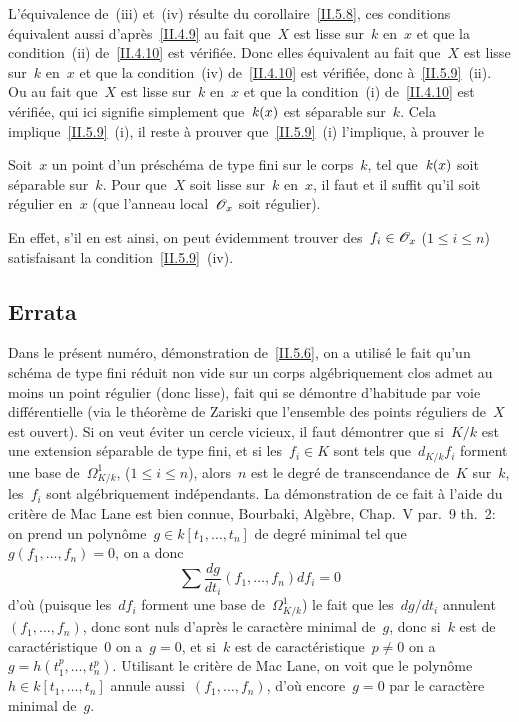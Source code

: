 L'\'equivalence de~(iii) et~(iv) r\'esulte du
corollaire~\ref{II.5.8}, ces conditions \'equivalent aussi
d'apr\`es~\ref{II.4.9} au fait que~$X$ est lisse sur~$k$ en~$x$ et
que la condition~(ii)
de~\ref{II.4.10}
est v\'erifi\'ee. Donc elles \'equivalent au fait que~$X$ est
lisse sur~$k$ en~$x$ et que la condition~(iv) de~\ref{II.4.10} est
v\'erifi\'ee, donc \`a~\ref{II.5.9}~(ii). Ou au fait que~$X$ est
lisse sur~$k$ en~$x$ et que la condition~(i) de~\ref{II.4.10} est
v\'erifi\'ee, qui ici signifie simplement
que~$\mathit{k}(x)$
est
s\'eparable sur~$k$. Cela implique~\ref{II.5.9}~(i), il reste \`a
prouver que~\ref{II.5.9}~(i) l'implique, \ie \`a prouver le

\begin{corollaire}
\label{II.5.10}
Soit~$x$ un point
d'un
pr\'esch\'ema de type fini sur le corps~$k$, tel
que~$\mathit{k}(x)$
soit s\'eparable sur~$k$. Pour que~$X$ soit lisse sur~$k$ en~$x$,
il faut et il suffit qu'il soit r\'egulier en~$x$ (\ie que l'anneau
local~$\cal{O}_x$ soit r\'egulier).
\end{corollaire}

En effet, s'il en est ainsi, on peut \'evidemment trouver
des~$f_i\in \cal{O}_x$ ($1\leq i\leq n$) satisfaisant la
condition~\ref{II.5.9}~(iv).

\subsection*{Errata}
\label{II.fin.errata}
Dans
le pr\'esent num\'ero, d\'emonstration de~\ref{II.5.6}, on
a utilis\'e le fait qu'un sch\'ema de type fini r\'eduit non
vide sur un corps alg\'ebriquement clos admet au moins un point
r\'egulier (donc lisse), fait qui se d\'emontre d'habitude par
voie diff\'erentielle (via le th\'eor\`eme de Zariski que
l'ensemble des points r\'eguliers de~$X$ est ouvert). Si on veut
\'eviter un cercle vicieux, il faut d\'emontrer que si~$K/k$ est
une extension s\'eparable de type fini, et si les~$f_i\in K$ sont
tels que~$d_{K/k}f_i$ forment une base de~$\Omega^1_{K/k}$, ($1\leq
i\leq n$), alors~$n$ est le degr\'e de transcendance de~$K$
sur~$k$,
\ie les~$f_i$ sont alg\'ebriquement ind\'ependants. La
d\'emonstration de ce fait \`a l'aide du crit\`ere de
Mac Lane
est bien connue, \cf Bourbaki, Alg\`ebre, Chap.\, V par.\, 9 th.\, 2: on
prend un polyn\^ome~$g\in k[t_1,\dots,t_n]$ de degr\'e minimal
tel que~$g(f_1,\dots,f_n)=0$, on a donc
$$
\sum\frac{dg}{d t_i}(f_1,\dots,f_n) df_i=0
$$
d'o\`u (puisque les~$df_i$ forment une base de~$\Omega^1_{K/k}$) le
fait que les~$dg/d t_i$ annulent~$(f_1,\dots,f_n)$, donc sont nuls
d'apr\`es le caract\`ere minimal de~$g$, donc si~$k$ est de
caract\'eristique~$0$ on a~$g=0$, et si~$k$ est de
caract\'eristique~$p\neq 0$ on a~$g=h(t_1^p,\dots,t_n^p)$.
Utilisant le crit\`ere de
Mac Lane,
on voit que le
polyn\^ome~$h\in k[t_1,\dots,t_n]$ annule aussi~$(f_1,\dots,f_n)$,
d'o\`u encore~$g=0$ par le caract\`ere minimal de~$g$.

